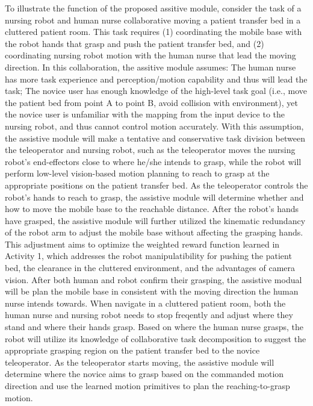 \documentclass[letterpaper, 11 pt, onecolumn]{article}
\begin{document}
To illustrate the function of the proposed assitive module, consider the task of a nursing robot and human nurse collaborative moving a patient transfer bed in a cluttered patient room. This task requires (1) coordinating the mobile base with the robot hands that grasp and push the patient transfer bed, and (2) coordinating nursing robot motion with the human nurse that lead the moving direction. In this collaboration, the assitive module assumes: The human nurse has more task experience and perception/motion capability and thus will lead the task; The novice user has enough knowledge of the high-level task goal (i.e., move the patient bed from point A to point B, avoid collision with environment), yet the novice user is unfamiliar with the mapping from the input device to the nursing robot, and thus cannot control motion accurately. With this assumption, the assistive module will make a tentative and conservative task division between the teleoperator and nursing robot, such as the teleoperator moves the nursing robot's end-effectors close to where he/she intends to grasp, while the robot will perform low-level vision-based motion planning to reach to grasp at the appropriate positions on the patient transfer bed. As the teleoperator controls the robot's hands to reach to grasp, the assistive module will determine whether and how to move the mobile base to the reachable distance. After the robot's hands have grasped, the assistive module will further utilized the kinematic redundancy of the robot arm to adjust the mobile base without affecting the grasping hands. This adjustment aims to optimize the weighted reward function learned in Activity 1, which addresses the robot manipulatibility for pushing the patient bed, the clearance in the cluttered environment, and the advantages of camera vision. After both human and robot confirm their grasping, the assistive modual will be plan the mobile base in consistent with the moving direction the human nurse intends towards. When navigate in a cluttered patient room, both the human nurse and nursing robot needs to stop freqently and adjust where they stand and where their hands grasp. Based on where the human nurse grasps, the robot will utilize its knowledge of collaborative task decomposition to suggest the appropriate grasping region on the patient transfer bed to the novice teleoperator. As the teleoperator starts moving, the assistive module will determine where the novice aims to grasp based on the commanded motion direction and use the learned motion primitives to plan the reaching-to-grasp motion. 
\end{document}
